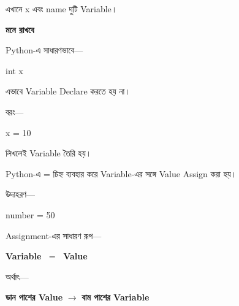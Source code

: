 এখানে
\textenglish{\ttfamily x}
এবং
\textenglish{\ttfamily name}
দুটি Variable।

\begin{rememberbox}

\textbf{\color{deepOrange}মনে রাখবে}

Python-এ সাধারণভাবে—

\begin{codebox}

\begin{english}
\ttfamily
int x
\end{english}

\end{codebox}

এভাবে Variable Declare করতে হয় না।

বরং—

\begin{codebox}

\begin{english}
\ttfamily
x = 10
\end{english}

\end{codebox}

লিখলেই Variable তৈরি হয়।

\end{rememberbox}



Python-এ
\textenglish{\ttfamily =}
চিহ্ন ব্যবহার করে Variable-এর সঙ্গে Value Assign করা হয়।

উদাহরণ—

\begin{codebox}

\begin{english}
\ttfamily
number = 50
\end{english}

\end{codebox}

Assignment-এর সাধারণ রূপ—

\begin{center}

\textbf{Variable}
\(\;=\;\)
\textbf{Value}

\end{center}

অর্থাৎ—

\begin{center}

\textbf{ডান পাশের Value}
\(\longrightarrow\)
\textbf{বাম পাশের Variable}

\end{center}

